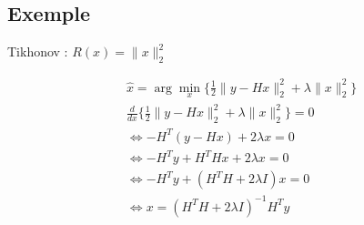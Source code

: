 \subsection{Exemple}

\frame{
    \tableofcontents[ 
        currentsubsection, 
    ]
}

\begin{frame}{Tikhonov : $R(x) = \lVert x \rVert_{2}^{2}$}

\begin{align*}
&\hat{x} = \arg\min\limits_{x} \{ 
    \frac{1}{2} \lVert y - Hx \rVert_{2}^{2} 
    + \lambda \lVert x \rVert_{2}^{2}
\} \\
&\frac{d}{dx} \{
    \frac{1}{2} \lVert y - Hx \rVert_{2}^{2} 
    + \lambda \lVert x \rVert_{2}^{2}
\} = 0 \\
&\iff - H^{T} (y - Hx) + 2\lambda x = 0 \\
&\iff - H^{T} y + H^{T}Hx + 2\lambda x = 0 \\
&\iff - H^{T} y + (H^{T}H + 2\lambda I) x = 0 \\
&\iff x = (H^{T}H + 2\lambda I)^{-1} H^{T} y \\
\end{align*}

\end{frame}